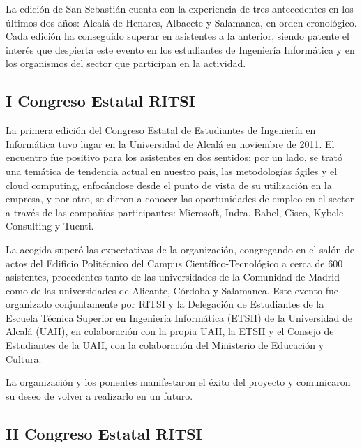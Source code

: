 \documentclass[11pt]{ritsi/article}
\begin{document}
La edición de San Sebastián cuenta con la experiencia de tres antecedentes en los últimos dos años: Alcalá de Henares, Albacete y Salamanca, en orden cronológico. Cada edición ha conseguido superar en asistentes a la anterior, siendo patente el interés que despierta este evento en los estudiantes de Ingeniería Informática y en los organismos del sector que participan en la actividad.

\subsection{I Congreso Estatal RITSI}

La primera edición del Congreso Estatal de Estudiantes de Ingeniería en Informática tuvo lugar en la Universidad de Alcalá en noviembre de 2011. El encuentro fue positivo para los asistentes en dos sentidos: por un lado, se trató una temática de tendencia actual en nuestro país, las metodologías ágiles y el cloud computing, enfocándose desde el punto de vista de su utilización en la empresa, y por otro, se dieron a conocer las oportunidades de empleo en el sector a través de las compañías participantes: Microsoft, Indra, Babel, Cisco, Kybele Consulting y Tuenti.

La acogida superó las expectativas de la organización, congregando en el salón de actos del Edificio Politécnico del Campus Científico-Tecnológico a cerca de 600 asistentes, procedentes tanto de las universidades de la Comunidad de Madrid como de las universidades de Alicante, Córdoba y Salamanca. Este evento fue organizado conjuntamente por RITSI y la Delegación de Estudiantes de la Escuela Técnica Superior en Ingeniería Informática (ETSII) de la Universidad de Alcalá (UAH), en colaboración con la propia UAH, la ETSII y el Consejo de Estudiantes de la UAH, con la colaboración del Ministerio de Educación y Cultura.

La organización y los ponentes manifestaron el éxito del proyecto y comunicaron su deseo de volver a realizarlo en un futuro.

\subsection{II Congreso Estatal RITSI}
\end{document}
